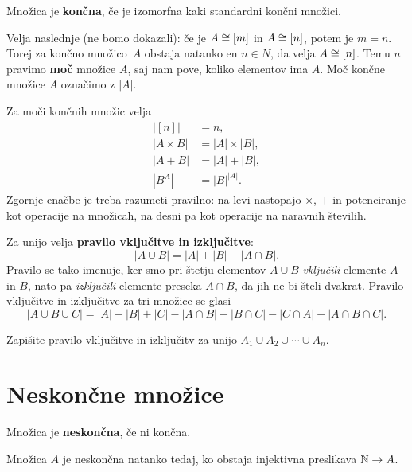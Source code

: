 \begin{definicija}
  Množica je \textbf{končna}, če je izomorfna kaki standardni končni množici.
\end{definicija}


Velja naslednje (ne bomo dokazali): če je $A \cong [m]$ in $A \cong [n]$, potem je $m = n$. Torej za končno
množico~$A$ obstaja natanko en $n \in N$, da velja $A \cong [n]$. Temu $n$ pravimo \textbf{moč} množice $A$,
saj nam pove, koliko elementov ima $A$. Moč končne množice $A$ označimo z $|A|$.

Za moči končnih množic velja
%
\begin{align*}
  |[n]| &= n, \\
  |A \times B| &= |A| \times |B|, \\
  |A + B| &= |A| + |B|, \\
  |B^A| &= |B|^{|A|}.
\end{align*}
%
Zgornje enačbe je treba razumeti pravilno: na levi nastopajo $\times$, $+$ in potenciranje kot operacije na množicah, na desni pa kot operacije na naravnih številih.

Za unijo velja \textbf{pravilo vključitve in izključitve}:
%
\begin{equation*}
 |A \cup B| = |A| + |B| - |A \cap B|.
\end{equation*}
%
Pravilo se tako imenuje, ker smo pri štetju elementov $A \cup B$ \emph{vključili} elemente $A$ in $B$, nato pa \emph{izključili} elemente preseka $A \cap B$, da jih ne bi šteli dvakrat.
%
Pravilo vključitve in izključitve za tri množice se glasi
%
\begin{equation*}
  |A \cup B \cup C| = |A| + |B| + |C| - |A \cap B| - |B \cap C| - |C \cap A| + |A \cap B \cap C|.
\end{equation*}

\begin{naloga}
  Zapišite pravilo vključitve in izključitv za unijo $A_1 \cup A_2 \cup \cdots \cup A_n$.
\end{naloga}


\section{Neskončne množice}

\begin{definicija}
  Množica je \textbf{neskončna}, če ni končna.
\end{definicija}

\begin{izrek}
  Množica $A$ je neskončna natanko tedaj, ko obstaja injektivna preslikava $\mathbb{N} \to A$.
\end{izrek}

